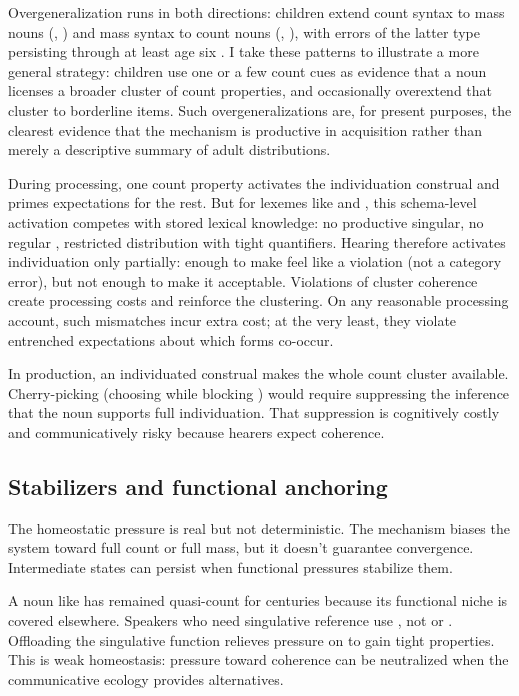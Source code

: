 \documentclass[12pt,a4paper]{article}
\begin{document}
Overgeneralization runs in both directions: children extend count syntax to mass nouns (, ) and mass syntax to count nouns (, ), with errors of the latter type persisting through at least age six \citep{gordon1985,gathercole1985}. I take these patterns to illustrate a more general strategy: children use one or a few count cues as evidence that a noun licenses a broader cluster of count properties, and occasionally overextend that cluster to borderline items. Such overgeneralizations are, for present purposes, the clearest evidence that the mechanism is productive in acquisition rather than merely a descriptive summary of adult distributions.

During processing, one count property activates the individuation construal and primes expectations for the rest. But for lexemes like  and , this schema-level activation competes with stored lexical knowledge: no productive singular, no regular , restricted distribution with tight quantifiers. Hearing  therefore activates individuation only partially: enough to make  feel like a violation (not a category error), but not enough to make it acceptable. Violations of cluster coherence create processing costs and reinforce the clustering.
On any reasonable processing account, such mismatches incur extra cost; at the very least, they violate entrenched expectations about which forms co-occur.

In production, an individuated construal makes the whole count cluster available. Cherry-picking (choosing  while blocking ) would require suppressing the inference that the noun supports full individuation. That suppression is cognitively costly and communicatively risky because hearers expect coherence.

\subsection{Stabilizers and functional anchoring}\label{sec:stabilizers}

The homeostatic pressure is real but not deterministic. The mechanism biases the system toward full count or full mass, but it doesn't guarantee convergence. Intermediate states can persist when functional pressures stabilize them.

A noun like  has remained quasi-count for centuries because its functional niche is covered elsewhere. Speakers who need singulative reference use , not  or . Offloading the singulative function relieves pressure on  to gain tight properties. This is weak homeostasis: pressure toward coherence can be neutralized when the communicative ecology provides alternatives.
\end{document}
